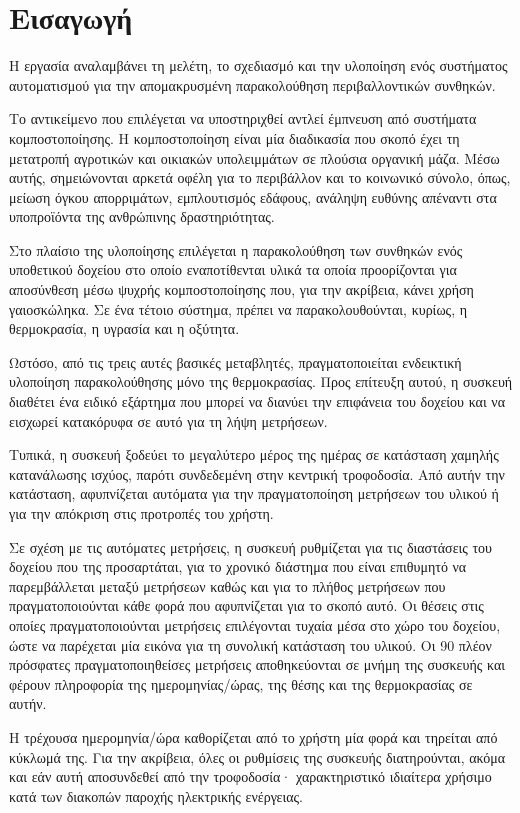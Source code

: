 \chapter{Εισαγωγή}

Η εργασία αναλαμβάνει τη μελέτη, το σχεδιασμό και την υλοποίηση ενός συστήματος
αυτοματισμού για την απομακρυσμένη παρακολούθηση περιβαλλοντικών συνθηκών.

Το αντικείμενο που επιλέγεται να υποστηριχθεί αντλεί έμπνευση από συστήματα
κομποστοποίησης. Η κομποστοποίηση είναι μία διαδικασία που σκοπό έχει τη
μετατροπή αγροτικών και οικιακών υπολειμμάτων σε πλούσια οργανική μάζα.
Μέσω αυτής, σημειώνονται αρκετά οφέλη για το περιβάλλον και το κοινωνικό σύνολο,
όπως, μείωση όγκου απορριμάτων, εμπλουτισμός εδάφους, ανάληψη ευθύνης απέναντι
στα υποπροϊόντα της ανθρώπινης δραστηριότητας.

Στο πλαίσιο της υλοποίησης επιλέγεται η παρακολούθηση των συνθηκών ενός
υποθετικού δοχείου στο οποίο εναποτίθενται υλικά τα οποία προορίζονται για
αποσύνθεση μέσω ψυχρής κομποστοποίησης που, για την ακρίβεια, κάνει χρήση
γαιοσκώληκα. Σε ένα τέτοιο σύστημα, πρέπει να παρακολουθούνται, κυρίως, η
θερμοκρασία, η υγρασία και η οξύτητα.

Ωστόσο, από τις τρεις αυτές βασικές μεταβλητές, πραγματοποιείται ενδεικτική
υλοποίηση παρακολούθησης μόνο της θερμοκρασίας. Προς επίτευξη αυτού, η συσκευή
διαθέτει ένα ειδικό εξάρτημα που μπορεί να διανύει την επιφάνεια του δοχείου
και να εισχωρεί κατακόρυφα σε αυτό για τη λήψη μετρήσεων.

Τυπικά, η συσκευή ξοδεύει το μεγαλύτερο μέρος της ημέρας σε κατάσταση χαμηλής
κατανάλωσης ισχύος, παρότι συνδεδεμένη στην κεντρική τροφοδοσία. Από αυτήν την
κατάσταση, αφυπνίζεται αυτόματα για την πραγματοποίηση μετρήσεων του υλικού ή
για την απόκριση στις προτροπές του χρήστη.

Σε σχέση με τις αυτόματες μετρήσεις, η συσκευή ρυθμίζεται για τις διαστάσεις του
δοχείου που της προσαρτάται, για το χρονικό διάστημα που είναι επιθυμητό να
παρεμβάλλεται μεταξύ μετρήσεων καθώς και για το πλήθος μετρήσεων που
πραγματοποιούνται κάθε φορά που αφυπνίζεται για το σκοπό αυτό.
Οι θέσεις στις οποίες πραγματοποιούνται μετρήσεις επιλέγονται τυχαία μέσα στο
χώρο του δοχείου, ώστε να παρέχεται μία εικόνα για τη συνολική κατάσταση του
υλικού. Οι 90 πλέον πρόσφατες πραγματοποιηθείσες μετρήσεις αποθηκεύονται σε
μνήμη της συσκευής και φέρουν πληροφορία της ημερομηνίας\slash{}ώρας, της θέσης
και της θερμοκρασίας σε αυτήν.

Η τρέχουσα ημερομηνία\slash{}ώρα καθορίζεται από το χρήστη μία φορά και τηρείται
από κύκλωμά της. Για την ακρίβεια, όλες οι ρυθμίσεις της συσκευής διατηρούνται,
ακόμα και εάν αυτή αποσυνδεθεί από την τροφοδοσία· χαρακτηριστικό ιδιαίτερα
χρήσιμο κατά των διακοπών παροχής ηλεκτρικής ενέργειας.

